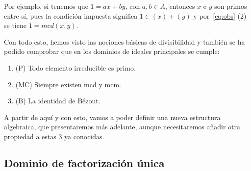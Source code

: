 \documentclass[12pt]{article}
\begin{document}
Por ejemplo, si tenemos que $1 = ax+by$, con $a,b \in A$, entonces $x$ e $y$ son primos entre sí, pues la condición impuesta significa $1 \in (x)+(y)$ y por~\ref{eq:obs} (2) se tiene $1 = mcd(x,y)$.

Con todo esto, hemos visto las nociones básicas de divisibilidad y también se ha podido comprobar que en los dominios de ideales principales se cumple: 
\begin{enumerate}
\item (P) Todo elemento irreducible es primo.
\item (MC) Siempre existen mcd y mcm.
\item (B) La identidad de Bézout.
\end{enumerate}

A partir de aquí y con esto, vamos a poder definir una nueva estructura algebraica, que presentaremos más adelante, aunque necesitaremos añadir otra propiedad a estas 3 ya conocidas.

\subsection{Dominio de factorización única}
\end{document}
